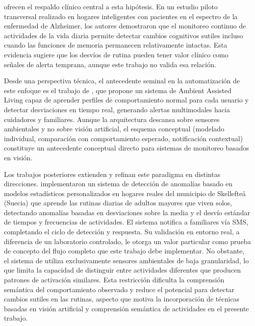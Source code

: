 \textcite{Grammatikopoulou2024} ofrecen el respaldo clínico central a esta hipótesis.
En un estudio piloto transversal realizado en hogares inteligentes con pacientes en el espectro de la enfermedad de Alzheimer, los autores demostraron que el monitoreo continuo de actividades de la vida diaria permite detectar cambios cognitivos sutiles incluso cuando las funciones de memoria permanecen relativamente intactas.
Esta evidencia sugiere que los desvíos de rutina pueden tener valor clínico como señales de alerta temprana, aunque este trabajo no valida esa relación.

Desde una perspectiva técnica, el antecedente seminal en la automatización de este enfoque es el trabajo de \textcite{Parvin2018}, que propone un sistema de Ambient Assisted Living capaz de aprender perfiles de comportamiento normal para cada usuario y detectar desviaciones en tiempo real, generando alertas multimodales hacia cuidadores y familiares.
Aunque la arquitectura descansa sobre sensores ambientales y no sobre visión artificial, el esquema conceptual (modelado individual, comparación con comportamiento esperado, notificación contextual) constituye un antecedente conceptual directo para sistemas de monitoreo basados en visión.

Los trabajos posteriores extienden y refinan este paradigma en distintas direcciones.
\textcite{Shahid2022} implementaron un sistema de detección de anomalías basado en modelos estadísticos personalizados en hogares reales del municipio de Skellefteå (Suecia) que aprende las rutinas diarias de adultos mayores que viven solos, detectando anomalías basadas en desviaciones sobre la media y el desvío estándar de tiempos y frecuencias de actividades. El sistema notifica a familiares vía SMS, completando el ciclo de detección y respuesta. Su validación en entorno real, a diferencia de un laboratorio controlado, le otorga un valor particular como prueba de concepto del flujo completo que este trabajo debe implementar. No obstante, el sistema de \textcite{Shahid2022} utiliza exclusivamente sensores ambientales de baja granularidad, lo que limita la capacidad de distinguir entre actividades diferentes que producen patrones de activación similares. Esta restricción dificulta la comprensión semántica del comportamiento observado y reduce el potencial para detectar cambios sutiles en las rutinas, aspecto que motiva la incorporación de técnicas basadas en visión artificial y comprensión semántica de actividades en el presente trabajo.

